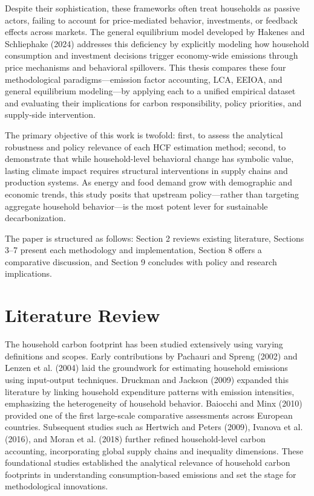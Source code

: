 \documentclass[12pt,a4paper]{article}%
\begin{document}
Despite their sophistication, these frameworks often treat households as passive actors, failing to account for price-mediated behavior, investments, or feedback effects across markets. The general equilibrium model developed by Hakenes and Schliephake (2024) addresses this deficiency by explicitly modeling how household consumption and investment decisions trigger economy-wide emissions through price mechanisms and behavioral spillovers. This thesis compares these four methodological paradigms—emission factor accounting, LCA, EEIOA, and general equilibrium modeling—by applying each to a unified empirical dataset and evaluating their implications for carbon responsibility, policy priorities, and supply-side intervention.

The primary objective of this work is twofold: first, to assess the analytical robustness and policy relevance of each HCF estimation method; second, to demonstrate that while household-level behavioral change has symbolic value, lasting climate impact requires structural interventions in supply chains and production systems. As energy and food demand grow with demographic and economic trends, this study posits that upstream policy—rather than targeting aggregate household behavior—is the most potent lever for sustainable decarbonization. 

The paper is structured as follows: Section 2 reviews existing literature, Sections 3–7 present each methodology and implementation, Section 8 offers a comparative discussion, and Section 9 concludes with policy and research implications.

\section{Literature Review}
The household carbon footprint has been studied extensively using varying definitions and scopes. Early contributions by Pachauri and Spreng (2002) and Lenzen et al. (2004) laid the groundwork for estimating household emissions using input-output techniques. Druckman and Jackson (2009) expanded this literature by linking household expenditure patterns with emission intensities, emphasizing the heterogeneity of household behavior. Baiocchi and Minx (2010) provided one of the first large-scale comparative assessments across European countries. Subsequent studies such as Hertwich and Peters (2009), Ivanova et al. (2016), and Moran et al. (2018) further refined household-level carbon accounting, incorporating global supply chains and inequality dimensions. These foundational studies established the analytical relevance of household carbon footprints in understanding consumption-based emissions and set the stage for methodological innovations.
\end{document}
